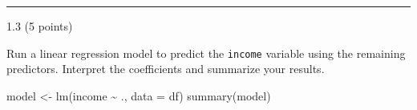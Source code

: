 \documentclass[
  letterpaper,
  DIV=11,
  numbers=noendperiod]{scrartcl}
\newenvironment{Shaded}{\begin{snugshade}}{\end{snugshade}}
\newcommand{\AttributeTok}[1]{\textcolor[rgb]{0.40,0.45,0.13}{#1}}
\newcommand{\FunctionTok}[1]{\textcolor[rgb]{0.28,0.35,0.67}{#1}}
\newcommand{\NormalTok}[1]{\textcolor[rgb]{0.00,0.23,0.31}{#1}}
\newcommand{\OtherTok}[1]{\textcolor[rgb]{0.00,0.23,0.31}{#1}}
\newcommand{\SpecialCharTok}[1]{\textcolor[rgb]{0.37,0.37,0.37}{#1}}
\begin{document}
\begin{center}\rule{0.5\linewidth}{0.5pt}\end{center}

1.3 (5 points)

Run a linear regression model to predict the \texttt{income} variable
using the remaining predictors. Interpret the coefficients and summarize
your results.

\begin{Shaded}
\begin{Highlighting}[]
\NormalTok{model }\OtherTok{\textless{}{-}} \FunctionTok{lm}\NormalTok{(income }\SpecialCharTok{\textasciitilde{}}\NormalTok{ ., }\AttributeTok{data =}\NormalTok{ df)}
\FunctionTok{summary}\NormalTok{(model)}
\end{Highlighting}
\end{Shaded}
\end{document}
